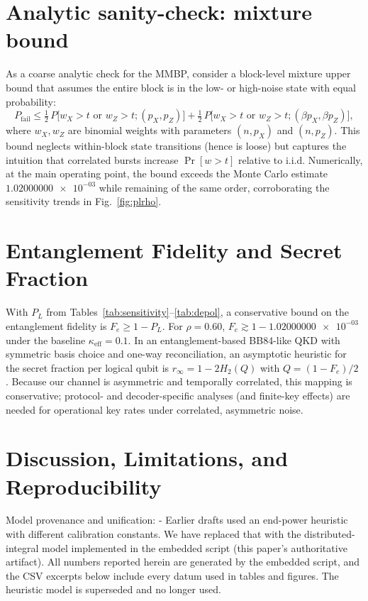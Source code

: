 \documentclass[conference]{IEEEtran}
\newcommand{\nexact}[1]{\num[round-mode=off]{#1}}
\newcommand{\simrhoB}{0.60}
\newcommand{\simpLB}{1.02000000e-03}
\begin{document}
\section{Analytic sanity-check: mixture bound}
As a coarse analytic check for the MMBP, consider a block-level mixture upper bound that assumes the entire block is in the low- or high-noise state with equal probability:
\begin{equation}
P_{\mathrm{fail}} \le \tfrac{1}{2}\,P\big[w_X>t \text{ or } w_Z>t; (p_X,p_Z)\big] + \tfrac{1}{2}\,P\big[w_X>t \text{ or } w_Z>t; (\beta p_X,\beta p_Z)\big],
\end{equation}
where \(w_X,w_Z\) are binomial weights with parameters \((n,p_X)\) and \((n,p_Z)\). This bound neglects within-block state transitions (hence is loose) but captures the intuition that correlated bursts increase \(\Pr[w>t]\) relative to i.i.d. Numerically, at the main operating point, the bound exceeds the Monte Carlo estimate \(\nexact{\simpLB}\) while remaining of the same order, corroborating the sensitivity trends in Fig.~\ref{fig:plrho}.

\section{Entanglement Fidelity and Secret Fraction}
With \(P_L\) from Tables~\ref{tab:sensitivity}--\ref{tab:depol}, a conservative bound on the entanglement fidelity is \(F_e \ge 1-P_L\). For \(\rho=\simrhoB\), \(F_e \gtrsim 1-\nexact{\simpLB}\) under the baseline \(\kappa_{\mathrm{eff}}=0.1\). In an entanglement-based BB84-like QKD with symmetric basis choice and one-way reconciliation, an asymptotic heuristic for the secret fraction per logical qubit is \(r_\infty=1-2H_2(Q)\) with \(Q=(1-F_e)/2\) \cite{DevetakWinter2005PRSA,Pirandola2020AOP}. Because our channel is asymmetric and temporally correlated, this mapping is conservative; protocol- and decoder-specific analyses (and finite-key effects) are needed for operational key rates under correlated, asymmetric noise.

\section{Discussion, Limitations, and Reproducibility}\label{sec:discussion}
Model provenance and unification:
- Earlier drafts used an end-power heuristic with different calibration constants. We have replaced that with the distributed-integral model implemented in the embedded script (this paper’s authoritative artifact). All numbers reported herein are generated by the embedded script, and the CSV excerpts below include every datum used in tables and figures. The heuristic model is superseded and no longer used.
\end{document}
